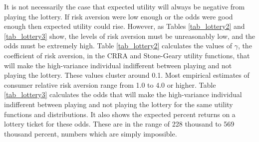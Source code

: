 \documentclass[letterpaper,12pt]{article}
\numberwithin{equation}{section}
\numberwithin{figure}{section}
\numberwithin{table}{section}
\begin{document}
\begin{spacing}{1.5}
	It is not necessarily the case that expected utility will always be negative from playing the lottery.  If risk aversion were low enough or the odds were good enough then expected utility could rise.  However, as Tables \ref{tab_lottery2} and \ref{tab_lottery3} show, the levels of risk aversion must be unreasonably low, and the odds must be extremely high.  Table \ref{tab_lottery2} calculates the values of $\gamma$, the coefficient of risk aversion, in the CRRA and Stone-Geary utility functions, that will make the high-variance individual indifferent between playing and not playing the lottery.  These values cluster around 0.1.  Most empirical estimates of consumer relative risk aversion range from 1.0 to 4.0 or higher.  Table \ref{tab_lottery3} calculates the odds that will make the high-variance individual indifferent between playing and not playing the lottery for the same utility functions and distributions.  It also shows the expected percent returns on a lottery ticket for these odds.  These are in the range of 228 thousand to 569 thousand percent, numbers which are simply impossible.



\end{spacing}
\end{document}
